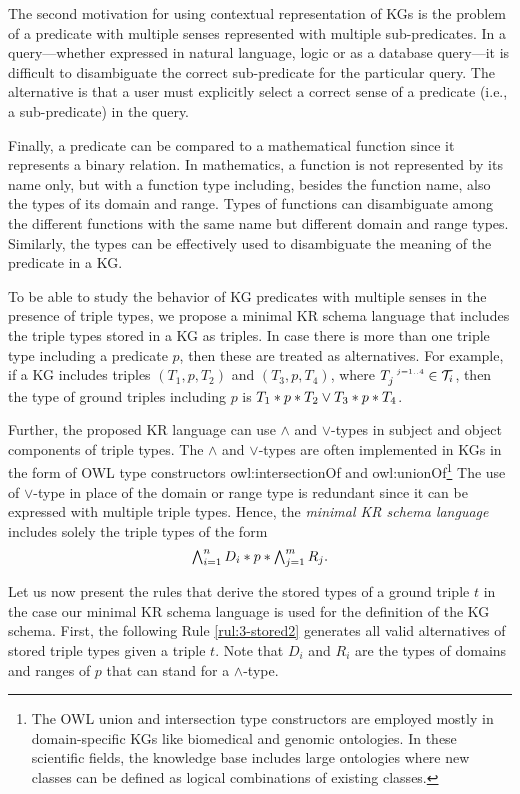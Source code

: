 \documentclass[runningheads]{llncs}
\newcommand{\s}{\scriptscriptstyle\ \,}
\newcommand{\T}{{\cal T}}
\begin{document}
The second motivation for using contextual representation of KGs is
the problem of a predicate with multiple senses represented with
multiple sub-predicates. In a query---whether expressed in natural
language, logic or as a database query---it is difficult to
disambiguate the correct sub-predicate for the particular query. The
alternative is that a user must explicitly select a correct sense of
a predicate (i.e., a sub-predicate) in the query.

Finally, a predicate can be compared to a mathematical function since
it represents a binary relation. In mathematics, a function is not
represented by its name only, but with a function type including,
besides the function name, also the types of its domain and
range. Types of functions can disambiguate among the different
functions with the same name but different domain and range
types. Similarly, the types can be effectively used to disambiguate
the meaning of the predicate in a KG.

To be able to study the behavior of KG predicates with multiple senses
in the presence of triple types, we propose a minimal KR schema
language that includes the triple types stored in a KG as triples. In
case there is more than one triple type including a predicate $p$,
then these are treated as alternatives. For example, if a KG includes
triples $(T_1,p,T_2)$ and $(T_3,p,T_4)$, where
$T_j^{\s\/j=1..4}\in\T_i$, then the type of ground triples including
$p$ is $T_1*p*T_2\lor\/T_3*p*T_4$.

Further, the proposed KR language can use $\land$ and $\lor$-types in
subject and object components of triple types. The $\land$ and
$\lor$-types are often implemented in KGs in the form of OWL type
constructors owl:intersectionOf and owl:unionOf\footnote{The OWL union
  and intersection type constructors are employed mostly in domain-specific KGs like biomedical and genomic ontologies. In these
  scientific fields, the knowledge base includes large ontologies where
  new classes can be defined as logical combinations of existing
  classes.} The use of $\lor$-type in place of the domain or range
type is redundant since it can be expressed with multiple triple
types. Hence, the \emph{minimal KR schema language} includes solely
the triple types of the form
$$\textstyle\bigwedge_{i=1}^n\/D_i*p*\bigwedge_{j=1}^m\/R_j.$$

Let us now present the rules that derive the stored types of a ground
triple $t$ in the case our minimal KR schema language is used for the
definition of the KG schema. First, the following Rule
\ref{rul:3-stored2} generates all valid alternatives of stored triple
types given a triple $t$. Note that $D_i$ and $R_i$ are the types of
domains and ranges of $p$ that can stand for a $\land$-type.
\end{document}
